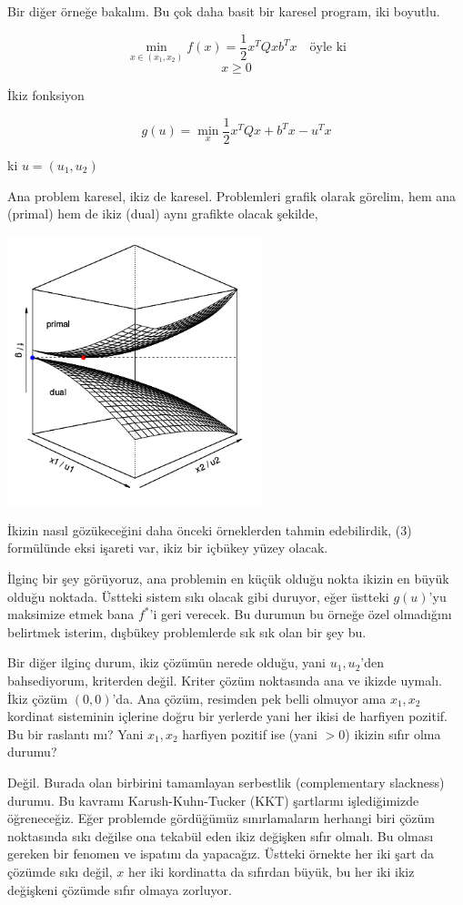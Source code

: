 \documentclass[12pt,fleqn]{article}\usepackage{../../common}
\begin{document}
Bir diğer örneğe bakalım. Bu çok daha basit bir karesel program, iki
boyutlu. 

$$
\min_{x \in (x_1,x_2)} f(x) = \frac{1}{2} x^T Q x b^T x \quad \textrm{öyle ki}
$$
$$
x \ge 0
$$

İkiz fonksiyon

$$
g(u) = \min_x \frac{1}{2} x^T Q x + b^T x - u^T x 
$$

ki $u = (u_1,u_2)$

Ana problem karesel, ikiz de karesel. Problemleri grafik olarak görelim,
hem ana (primal) hem de ikiz (dual) aynı grafikte olacak şekilde,

\includegraphics[width=20em]{func_56_gendual_03.png}

İkizin nasıl gözükeceğini daha önceki örneklerden tahmin edebilirdik, (3)
formülünde eksi işareti var, ikiz bir içbükey yüzey olacak.

İlginç bir şey görüyoruz, ana problemin en küçük olduğu nokta ikizin en
büyük olduğu noktada. Üstteki sistem sıkı olacak gibi duruyor, eğer üstteki
$g(u)$'yu maksimize etmek bana $f^\ast$'i geri verecek.  Bu durumun bu örneğe
özel olmadığını belirtmek isterim, dışbükey problemlerde sık sık olan bir
şey bu. 

Bir diğer ilginç durum, ikiz çözümün nerede olduğu, yani $u_1,u_2$'den
bahsediyorum, kriterden değil. Kriter çözüm noktasında ana ve ikizde
uymalı. İkiz çözüm $(0,0)$'da. Ana çözüm, resimden pek belli olmuyor ama
$x_1,x_2$ kordinat sisteminin içlerine doğru bir yerlerde yani her ikisi de
harfiyen pozitif. Bu bir raslantı mı? Yani $x_1,x_2$ harfiyen pozitif ise
(yani $>0$) ikizin sıfır olma durumu? 

Değil. Burada olan birbirini tamamlayan serbestlik (complementary
slackness) durumu. Bu kavramı Karush-Kuhn-Tucker (KKT) şartlarını
işlediğimizde öğreneceğiz. Eğer problemde gördüğümüz sınırlamaların
herhangi biri çözüm noktasında sıkı değilse ona tekabül eden ikiz değişken
sıfır olmalı. Bu olması gereken bir fenomen ve ispatını da yapacağız.
Üstteki örnekte her iki şart da çözümde sıkı değil, $x$ her iki kordinatta
da sıfırdan büyük, bu her iki ikiz değişkeni çözümde sıfır olmaya zorluyor.
\end{document}
